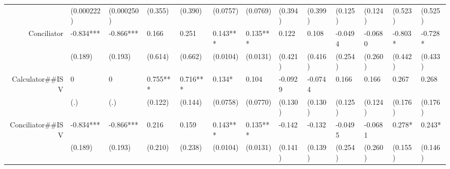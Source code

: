 \begin{tabular}{rrrrrrrrrrrrr}
      & \multicolumn{1}{l}{(0.000222)} & \multicolumn{1}{l}{(0.000250)} & \multicolumn{1}{l}{(0.355)} & \multicolumn{1}{l}{(0.390)} & \multicolumn{1}{l}{(0.0757)} & \multicolumn{1}{l}{(0.0769)} & \multicolumn{1}{l}{(0.394)} & \multicolumn{1}{l}{(0.399)} & \multicolumn{1}{l}{(0.125)} & \multicolumn{1}{l}{(0.124)} & \multicolumn{1}{l}{(0.523)} & \multicolumn{1}{l}{(0.525)} \\
Conciliator & \multicolumn{1}{l}{-0.834***} & \multicolumn{1}{l}{-0.866***} & \multicolumn{1}{l}{0.166} & \multicolumn{1}{l}{0.251} & \multicolumn{1}{l}{0.143***} & \multicolumn{1}{l}{0.135***} & \multicolumn{1}{l}{0.122} & \multicolumn{1}{l}{0.108} & \multicolumn{1}{l}{-0.0494} & \multicolumn{1}{l}{-0.0680} & \multicolumn{1}{l}{-0.803*} & \multicolumn{1}{l}{-0.728*} \\
      & \multicolumn{1}{l}{(0.189)} & \multicolumn{1}{l}{(0.193)} & \multicolumn{1}{l}{(0.614)} & \multicolumn{1}{l}{(0.662)} & \multicolumn{1}{l}{(0.0104)} & \multicolumn{1}{l}{(0.0131)} & \multicolumn{1}{l}{(0.421)} & \multicolumn{1}{l}{(0.416)} & \multicolumn{1}{l}{(0.254)} & \multicolumn{1}{l}{(0.260)} & \multicolumn{1}{l}{(0.442)} & \multicolumn{1}{l}{(0.433)} \\
Calculator\#\#ISV & \multicolumn{1}{l}{0} & \multicolumn{1}{l}{0} & \multicolumn{1}{l}{0.755***} & \multicolumn{1}{l}{0.716***} & \multicolumn{1}{l}{0.134*} & \multicolumn{1}{l}{0.104} & \multicolumn{1}{l}{-0.0929} & \multicolumn{1}{l}{-0.0744} & \multicolumn{1}{l}{0.166} & \multicolumn{1}{l}{0.166} & \multicolumn{1}{l}{0.267} & \multicolumn{1}{l}{0.268} \\
      & \multicolumn{1}{l}{(.)} & \multicolumn{1}{l}{(.)} & \multicolumn{1}{l}{(0.122)} & \multicolumn{1}{l}{(0.144)} & \multicolumn{1}{l}{(0.0758)} & \multicolumn{1}{l}{(0.0770)} & \multicolumn{1}{l}{(0.130)} & \multicolumn{1}{l}{(0.130)} & \multicolumn{1}{l}{(0.125)} & \multicolumn{1}{l}{(0.124)} & \multicolumn{1}{l}{(0.176)} & \multicolumn{1}{l}{(0.176)} \\
Conciliator\#\#ISV & \multicolumn{1}{l}{-0.834***} & \multicolumn{1}{l}{-0.866***} & \multicolumn{1}{l}{0.216} & \multicolumn{1}{l}{0.159} & \multicolumn{1}{l}{0.143***} & \multicolumn{1}{l}{0.135***} & \multicolumn{1}{l}{-0.142} & \multicolumn{1}{l}{-0.132} & \multicolumn{1}{l}{-0.0495} & \multicolumn{1}{l}{-0.0681} & \multicolumn{1}{l}{0.278*} & \multicolumn{1}{l}{0.243*} \\
      & \multicolumn{1}{l}{(0.189)} & \multicolumn{1}{l}{(0.193)} & \multicolumn{1}{l}{(0.210)} & \multicolumn{1}{l}{(0.238)} & \multicolumn{1}{l}{(0.0104)} & \multicolumn{1}{l}{(0.0131)} & \multicolumn{1}{l}{(0.141)} & \multicolumn{1}{l}{(0.139)} & \multicolumn{1}{l}{(0.254)} & \multicolumn{1}{l}{(0.260)} & \multicolumn{1}{l}{(0.155)} & \multicolumn{1}{l}{(0.146)} \\

\end{tabular}
